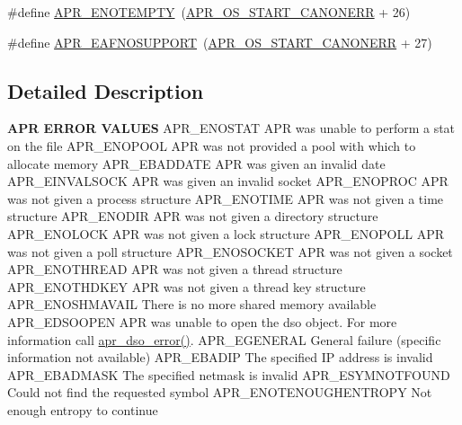 \begin{DoxyCompactItemize}
\item 
\#define \hyperlink{group___a_p_r___error_ga01d9259eccdf0576f58b89c4ad8ca4eb}{A\+P\+R\+\_\+\+E\+N\+O\+T\+E\+M\+P\+TY}~(\hyperlink{group__apr__errno_ga7bca957c11b80b31cb54b0d2cbe9e025}{A\+P\+R\+\_\+\+O\+S\+\_\+\+S\+T\+A\+R\+T\+\_\+\+C\+A\+N\+O\+N\+E\+RR} + 26)
\item 
\#define \hyperlink{group___a_p_r___error_ga76b558840838bcb94a4811a8e52df7a6}{A\+P\+R\+\_\+\+E\+A\+F\+N\+O\+S\+U\+P\+P\+O\+RT}~(\hyperlink{group__apr__errno_ga7bca957c11b80b31cb54b0d2cbe9e025}{A\+P\+R\+\_\+\+O\+S\+\_\+\+S\+T\+A\+R\+T\+\_\+\+C\+A\+N\+O\+N\+E\+RR} + 27)
\end{DoxyCompactItemize}


\subsection{Detailed Description}

\begin{DoxyPre}
{\bfseries APR ERROR VALUES}
APR\_ENOSTAT      APR was unable to perform a stat on the file
APR\_ENOPOOL      APR was not provided a pool with which to allocate memory
APR\_EBADDATE     APR was given an invalid date
APR\_EINVALSOCK   APR was given an invalid socket
APR\_ENOPROC      APR was not given a process structure
APR\_ENOTIME      APR was not given a time structure
APR\_ENODIR       APR was not given a directory structure
APR\_ENOLOCK      APR was not given a lock structure
APR\_ENOPOLL      APR was not given a poll structure
APR\_ENOSOCKET    APR was not given a socket
APR\_ENOTHREAD    APR was not given a thread structure
APR\_ENOTHDKEY    APR was not given a thread key structure
APR\_ENOSHMAVAIL  There is no more shared memory available
APR\_EDSOOPEN     APR was unable to open the dso object.  For more
                 information call \hyperlink{group__apr__dso_gafa34fc75e1e9b8856385d3b18cfac05c}{apr\_dso\_error()}.
APR\_EGENERAL     General failure (specific information not available)
APR\_EBADIP       The specified IP address is invalid
APR\_EBADMASK     The specified netmask is invalid
APR\_ESYMNOTFOUND Could not find the requested symbol
APR\_ENOTENOUGHENTROPY Not enough entropy to continue
\end{DoxyPre}




